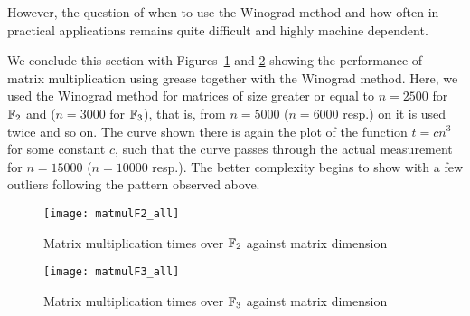 However, the question of when to use the Winograd method and how often
in practical applications remains quite difficult and highly machine
dependent.

%
%

We conclude this section with Figures~\ref{matmulf2} and
\ref{matmulf3} showing the
performance of matrix multiplication using grease together with
the Winograd method. Here, we used the Winograd method for matrices
of size greater or equal to $n=2500$ for $\mathbb{F}_2$ and ($n=3000$ for
$\mathbb{F}_3$), that is, from $n=5000$ ($n=6000$ resp.) on it
is used twice and so on. The curve shown there is 
again the plot of the function $t = cn^3$ for some constant $c$, such
that the curve passes through the actual measurement for $n=15000$
($n=10000$ resp.).
The better complexity begins to show with a few outliers following
the pattern observed above.

\begin{figure}[ht]
\begin{center}
\texttt{[image: matmulF2\_all]}
\end{center}
\caption{Matrix multiplication times over $\mathbb{F}_2$ against matrix dimension}
\label{matmulf2}
\end{figure}

\begin{figure}[ht]
\begin{center}
\texttt{[image: matmulF3\_all]}
\end{center}
\caption{Matrix multiplication times over $\mathbb{F}_3$ against matrix dimension}
\label{matmulf3}
\end{figure}

